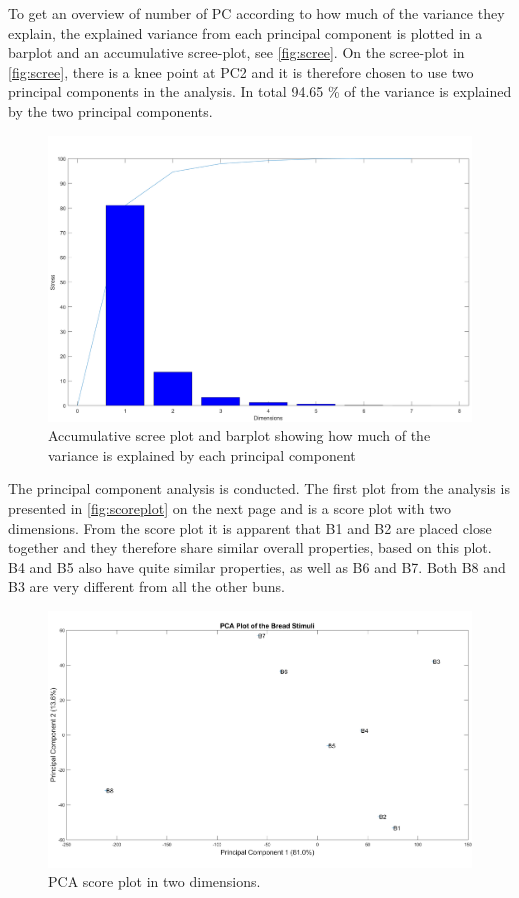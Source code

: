 \noindent
\newpage
%
To get an overview of number of PC according to how much of the variance they explain, the explained variance from each principal component is plotted in a barplot and an accumulative scree-plot, see \autoref{fig:scree}. On the scree-plot in \autoref{fig:scree}, there is a knee point at PC2 and it is therefore chosen to use two principal components in the analysis. In total 94.65 \% of the variance is explained by the two principal components.
\begin{figure}[H]
\centering
\includegraphics[width =\textwidth]{Figure/Screeplot}
\caption{Accumulative scree plot and barplot showing how much of the variance is explained by each principal component}
\label{fig:scree}
\end{figure}
\noindent
%
%
The principal component analysis is conducted. The first plot from the analysis is presented in \autoref{fig:scoreplot} on the next page and is a score plot with two dimensions. \blankline
%
From the score plot it is apparent that B1 and B2 are placed close together and they therefore share similar overall properties, based on this plot. B4 and B5 also have quite similar properties, as well as B6 and B7. Both B8 and B3 are very different from all the other buns.
\newpage
%
\begin{figure}[H]
\centering
\includegraphics[width =\textwidth]{Figure/PCA_plot}
\caption{PCA score plot in two dimensions.}
\label{fig:scoreplot}
\end{figure}
